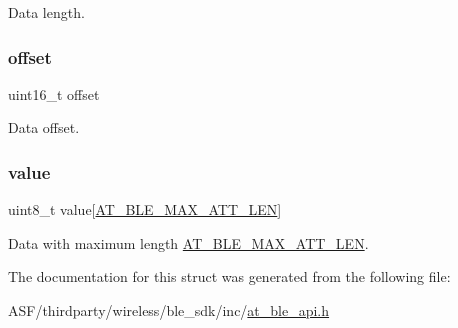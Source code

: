 Data length. 

\mbox{\label{structat__ble__characteristic__write__request__t_ac681806181c80437cfab37335f62ff39}} 
\subsubsection{\texorpdfstring{offset}{offset}}
{\footnotesize\ttfamily uint16\+\_\+t offset}



Data offset. 

\mbox{\label{structat__ble__characteristic__write__request__t_ad96d1daae71cc8407c9c2079f8e8bf47}} 
\subsubsection{\texorpdfstring{value}{value}}
{\footnotesize\ttfamily uint8\+\_\+t value\mbox{[}\mbox{\hyperlink{at__ble__api_8h_aef91d9f37b950f3551cde0f9f5b01c50}{A\+T\+\_\+\+B\+L\+E\+\_\+\+M\+A\+X\+\_\+\+A\+T\+T\+\_\+\+L\+EN}}\mbox{]}}



Data with maximum length \mbox{\hyperlink{at__ble__api_8h_aef91d9f37b950f3551cde0f9f5b01c50}{A\+T\+\_\+\+B\+L\+E\+\_\+\+M\+A\+X\+\_\+\+A\+T\+T\+\_\+\+L\+EN}}. 



The documentation for this struct was generated from the following file\+:\begin{DoxyCompactItemize}
\item 
A\+S\+F/thirdparty/wireless/ble\+\_\+sdk/inc/\mbox{\hyperlink{at__ble__api_8h}{at\+\_\+ble\+\_\+api.\+h}}\end{DoxyCompactItemize}
